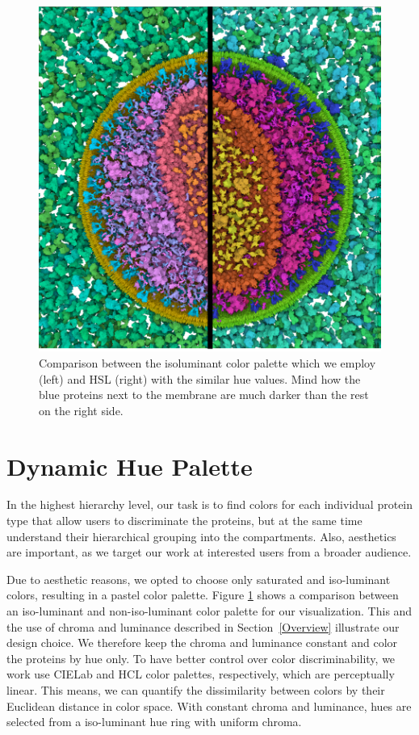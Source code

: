 \documentclass[review,journal]{vgtc}         %
\begin{document}
	\begin{figure}
\centering
\includegraphics[width=0.7\linewidth]{Figures/hslvshcl}
\caption{Comparison between the isoluminant color palette which we employ (left) and HSL (right) with the similar hue values. Mind how the blue proteins next to the membrane are much darker than the rest on the right side.}
\label{fig:hslvshcl}
\end{figure}

	
	\section{Dynamic Hue Palette}
	\label{sec:hue}
	
	In the highest hierarchy level, our task is to find colors for each individual protein type that allow users to discriminate the proteins, but at the same time understand their hierarchical grouping into the compartments. 
	Also, aesthetics are important, as we target our work at interested users from a broader audience. 
	
	Due to aesthetic reasons, we opted to choose only saturated and iso-luminant colors, resulting in a pastel color palette. 
	Figure \ref{fig:hslvshcl} shows a comparison between an iso-luminant and non-iso-luminant color palette for our visualization. This and the use of chroma and luminance described in Section~\ref{Overview} illustrate our design choice. 
	We therefore keep the chroma and luminance constant and color the proteins by hue only. 
	To have better control over color discriminability, we work use CIELab and HCL color palettes, respectively, which are perceptually linear. 
	This means, we can quantify the dissimilarity between colors by their Euclidean distance in color space. 
	With constant chroma and luminance, hues are selected from a iso-luminant hue ring with uniform chroma. 
	
\end{document}
